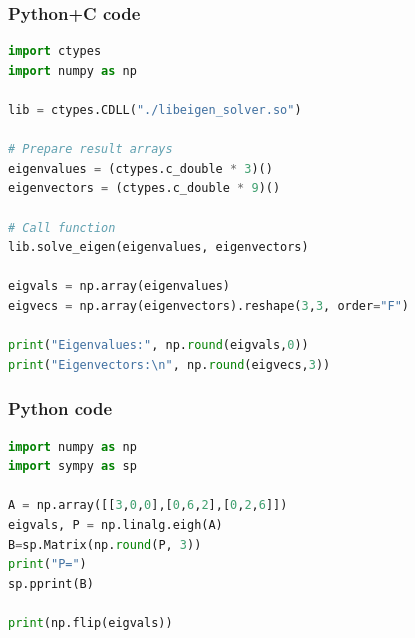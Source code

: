 \documentclass{beamer}
\begin{document}
\begin{frame}[fragile]
    \frametitle{Python+C code}

    \begin{lstlisting}[language=Python]
import ctypes
import numpy as np

lib = ctypes.CDLL("./libeigen_solver.so")

# Prepare result arrays
eigenvalues = (ctypes.c_double * 3)()
eigenvectors = (ctypes.c_double * 9)()

# Call function
lib.solve_eigen(eigenvalues, eigenvectors)

eigvals = np.array(eigenvalues)
eigvecs = np.array(eigenvectors).reshape(3,3, order="F")  

print("Eigenvalues:", np.round(eigvals,0))
print("Eigenvectors:\n", np.round(eigvecs,3))
    \end{lstlisting}
\end{frame}

\begin{frame}[fragile]
    \frametitle{Python code}
    \begin{lstlisting}[language=Python]
import numpy as np
import sympy as sp

A = np.array([[3,0,0],[0,6,2],[0,2,6]])
eigvals, P = np.linalg.eigh(A)
B=sp.Matrix(np.round(P, 3))
print("P=")
sp.pprint(B)

print(np.flip(eigvals))
    \end{lstlisting}   
\end{frame}
\end{document}
